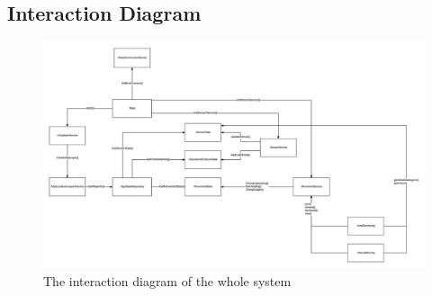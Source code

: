 \subsection{Interaction Diagram}
\begin{figure}[H]
	\centering
	\hspace*{-25mm}
	\includegraphics[width=1.4\textwidth]{InteractionDiagram.png}	
	\caption{\label{fig:diagramInteraction}The interaction diagram of the whole system}
\end{figure}	